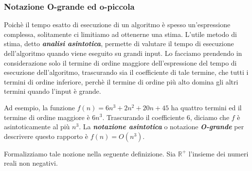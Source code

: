 \documentclass{article}
\begin{document}
\subsubsection{Notazione O-grande ed o-piccola}
Poichè il tempo esatto di esecuzione di un algoritmo è spesso un'espressione complessa, solitamente ci limitiamo ad ottenerne una stima.
L'utile metodo di stima, detto \textit{\textbf{analisi asintotica}}, permette di valutare il tempo di esecuzione dell'algoritmo quando viene eseguito su grandi input.
Lo facciamo prendendo in considerazione solo il termine di ordine maggiore dell'espressione del tempo di esecuzione dell'algoritmo, trascurando sia il coefficiente di tale termine, che tutti i termini di ordine inferiore, perchè il termine di ordine più alto domina gli altri termini quando l'input è grande.

Ad esempio, la funzione $f(n) = 6n^3 + 2n^2 + 20n + 45$ ha quattro termini ed il termine di ordine maggiore è $6n^3$.
Trascurando il coefficiente $6$, diciamo che $f$ è asintoticamente al più $n^3$.
La \textit{\textbf{notazione asintotica}} o notazione \textit{\textbf{O-grande}} per descrivere questo rapporto è $f(n) = O(n^3)$.

Formalizziamo tale nozione nella seguente definizione. Sia $\mathbb{R}^+$ l'insieme dei numeri reali non negativi.
\newline
\end{document}
